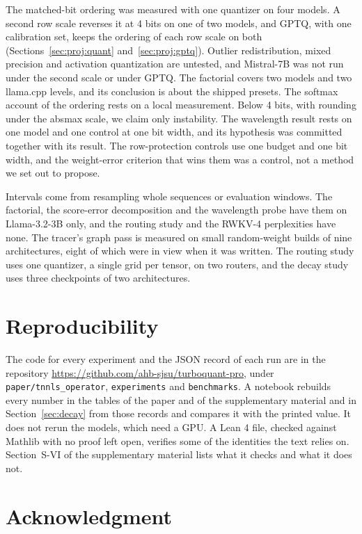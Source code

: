 \documentclass[journal]{IEEEtran}
\newif\ifanon
\begin{document}
The matched-bit ordering was measured with one quantizer on four models. A second row scale
reverses it at 4 bits on one of two models, and GPTQ, with one calibration set, keeps the
ordering of each row scale on both (Sections~\ref{sec:proj:quant} and~\ref{sec:proj:gptq}).
Outlier redistribution, mixed precision and activation quantization are untested, and Mistral-7B
was not run under the second scale or under GPTQ. The factorial covers two models and two
llama.cpp levels, and its conclusion is about the shipped presets. The softmax account of the
ordering rests on a local measurement. Below 4 bits, with rounding under the absmax scale, we
claim only instability. The wavelength result rests on one model and one control at one bit
width, and its hypothesis was committed together with its result. The row-protection controls use
one budget and one bit width, and the weight-error criterion that wins them was a control, not a
method we set out to propose.

Intervals come from resampling whole sequences or evaluation windows. The factorial, the
score-error decomposition and the wavelength probe have them on Llama-3.2-3B only, and the
routing study and the RWKV-4 perplexities have none. The tracer's graph pass is measured on small
random-weight builds of nine architectures, eight of which were in view when it was written. The
routing study uses one quantizer, a single grid per tensor, on two routers, and the decay study
uses three checkpoints of two architectures.

\section*{Reproducibility}

The code for every experiment and the JSON record of each run are in
\ifanon the anonymized code archive submitted with the manuscript\else the repository
\url{https://github.com/ahb-sjsu/turboquant-pro}\fi, under \texttt{paper/tnnls\_operator},
\texttt{experiments} and \texttt{benchmarks}. A notebook rebuilds every number in the tables of
the paper and of the supplementary material and in Section~\ref{sec:decay} from those records and
compares it with the printed value. It does not rerun the models, which need a GPU. A Lean 4
file, checked against Mathlib with no proof left open, verifies some of the identities the text
relies on. Section~S-VI of the supplementary material lists what it checks and what it does not.

\ifanon\else
\section*{Acknowledgment}


\fi



\end{document}
